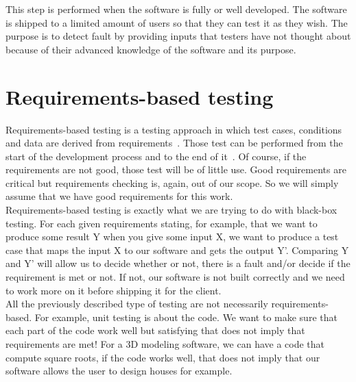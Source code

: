 \documentclass[12pt]{article}
\theoremstyle{definition}
\theoremstyle{definition}
\theoremstyle{remark}
\begin{document}
This step is performed when the software is fully or well developed. The software is shipped to a limited amount of users so that they can test it as they wish. The purpose is to detect fault by providing inputs that testers have not thought about because of their advanced knowledge of the software and its purpose.



\section{Requirements-based testing}


Requirements-based testing is a testing approach in which test cases, conditions and data are derived from requirements~\cite{IBMRequirementBasedTesting:2017}. Those test can be performed from the start of the development process and to the end of it~\cite{BenderRBTRequirementBasedTesting:2017}. Of course, if the requirements are not good, those test will be of little use. Good requirements are critical but requirements checking is, again, out of our scope. So we will simply assume that we have good requirements for this work.\\

Requirements-based testing is exactly what we are trying to do with black-box testing. For each given requirements stating, for example, that we want to produce some result Y when you give some input X, we want to produce a test case that maps the input X to our software and gets the output Y'. Comparing Y and Y' will allow us to decide whether or not, there is a fault and/or decide if the requirement is met or not. If not, our software is not built correctly and we need to work more on it before shipping it for the client.\\

All the previously described type of testing are not necessarily requirements-based. For example, unit testing is about the code. We want to make sure that each part of the code work well but satisfying that does not imply that requirements are met! For a 3D modeling software, we can have a code that compute square roots, if the code works well, that does not imply that our software allows the user to design houses for example.\\


\clearpage
\end{document}
